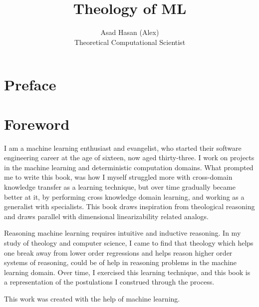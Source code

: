 \documentclass[ebook,12pt,oneside,openany]{memoir}
\title{Theology of ML}
\author{Asad Hasan (Alex) \\ Theoretical Computational Scientist}
\begin{document}
\makeatletter
\renewcommand{\@date}{} %
\makeatother
\maketitle
\chapter*{Preface}


\vspace*{\fill} %


\vspace*{\fill} %


\chapter*{Foreword}


\indent \indent I am a machine learning enthusiast and evangelist, who started their software engineering career at the age of sixteen, now aged thirty-three. I work on projects in the machine learning and deterministic computation domains. What prompted me to write this book, was how I myself struggled more with cross-domain knowledge transfer as a learning technique, but over time gradually became better at it, by performing cross knowledge domain learning, and working as a generalist with specialists. This book draws inspiration from theological reasoning and draws parallel with dimensional linearizability related analogs.

\indent Reasoning machine learning requires intuitive and inductive reasoning. In my study of theology and computer science, I came to find that theology which helps one break away from lower order regressions and helps reason higher order systems of reasoning, could be of help in reasoning problems in the machine learning domain. Over time, I exercised this learning technique, and this book is a representation of the postulations I construed through the process.

\indent This work was created with the help of machine learning.
\end{document}
